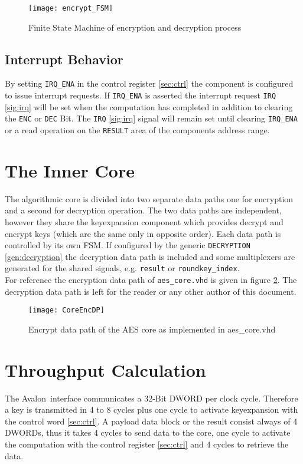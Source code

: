 \documentclass{ruschidoc}
\begin{document}
\begin{figure}[!ht]
  \centering
  \texttt{[image: encrypt\_FSM]}
  \caption{Finite State Machine of encryption and decryption process}
  \label{fig:aesFSM}
\end{figure}


\subsection{Interrupt Behavior}
\label{sec:irq}
By setting \texttt{IRQ\_ENA} in the control register \ref{sec:ctrl} the
component is configured to issue interrupt requests.
If \texttt{IRQ\_ENA} is asserted the interrupt request \texttt{IRQ} \ref{sig:irq} will be set when the
computation has completed in addition to clearing the \texttt{ENC} or \texttt{DEC}
Bit.
The \texttt{IRQ} \ref{sig:irq}  signal will remain set until clearing \texttt{IRQ\_ENA}
or a read operation on the \texttt{RESULT} area of the components address range. 

\section{The Inner Core}
\label{sec:core}
The algorithmic core is divided into two separate data paths one for encryption and a
second for decryption operation. The two data paths are independent, however they
share the keyexpansion component which provides decrypt and encrypt keys (which are
the same only in opposite order). Each data path is controlled by its own \gls{FSM}.  If
configured by the generic \texttt{DECRYPTION} \ref{gen:decryption} the decryption
data path is included and some multiplexers are generated for the shared signals,
e.g. \texttt{result} or \texttt{roundkey\_index}.\\
For reference the encryption data path of \texttt{aes\_core.vhd} is given in figure
\ref{fig:aescore}. The decryption data path is left for the reader or any other author
of this document.
\newpage
\begin{figure}[!ht]
  \centering
  \texttt{[image: CoreEncDP]}
  \caption{Encrypt data path of the AES core as implemented in aes\_core.vhd}
  \label{fig:aescore}
\end{figure}
\newpage
\section{Throughput Calculation}
\label{sec:throughput}
The Avalon\rtm\ interface communicates a 32-Bit DWORD per clock cycle. Therefore a key is transmitted in 4 to 8 cycles
plus one cycle to activate keyexpansion with the control word \ref{sec:ctrl}. A payload data block or the result consist
always of 4 DWORDs, thus it takes 4 cycles to send data to the core, one cycle to activate the computation with the
control register \ref{sec:ctrl} and 4 cycles to retrieve the data.
\end{document}

